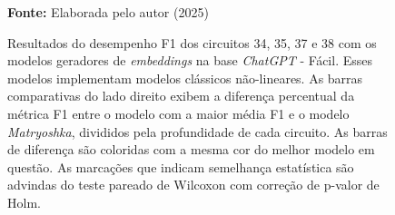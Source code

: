 \begin{figure}
\caption{Resultados do desempenho F1 dos circuitos 34, 35, 37 e 38 com os modelos geradores de \textit{embeddings} na base \textit{ChatGPT} - Fácil. Esses modelos implementam modelos clássicos não-lineares. As barras comparativas do lado direito exibem a diferença percentual da métrica F1 entre o modelo com a maior média F1 e o modelo \textit{Matryoshka}, divididos pela profundidade de cada circuito. As barras de diferença são coloridas com a mesma cor do melhor modelo em questão. As marcações que indicam semelhança estatística são advindas do teste pareado de Wilcoxon com correção de p-valor de Holm.}
\label{fig:model_transformer:easy:g5}
     \centering
    \centering

      \par\medskip\ABNTEXfontereduzida\selectfont\textbf{Fonte:} Elaborada pelo autor (2025) \par\medskip
\end{figure}
